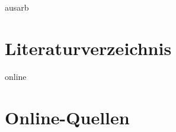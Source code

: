 \documentclass[11pt,a4paper]{article} %
\begin{document}
\begin{btSect}{ausarb}
\section*{Literaturverzeichnis}
\btPrintCited
\end{btSect}
\begin{btSect}{online}
\section*{Online-Quellen}
\btPrintCited
\end{btSect}
\end{document}
